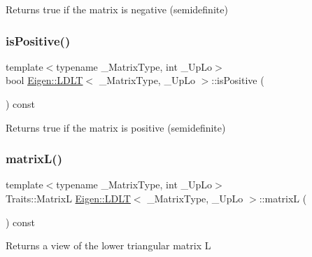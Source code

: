 \begin{DoxyReturn}{Returns}
true if the matrix is negative (semidefinite) 
\end{DoxyReturn}
\mbox{\label{class_eigen_1_1_l_d_l_t_a5e1c6b7ba8d7b82575d6ffdc3bf35bcb}} 
\subsubsection{\texorpdfstring{isPositive()}{isPositive()}}
{\footnotesize\ttfamily template$<$typename \+\_\+\+Matrix\+Type, int \+\_\+\+Up\+Lo$>$ \\
bool \mbox{\hyperlink{class_eigen_1_1_l_d_l_t}{Eigen\+::\+L\+D\+LT}}$<$ \+\_\+\+Matrix\+Type, \+\_\+\+Up\+Lo $>$\+::is\+Positive (\begin{DoxyParamCaption}{ }\end{DoxyParamCaption}) const\hspace{0.3cm}{\ttfamily [inline]}}

\begin{DoxyReturn}{Returns}
true if the matrix is positive (semidefinite) 
\end{DoxyReturn}
\mbox{\label{class_eigen_1_1_l_d_l_t_af0e6a0df5679873b42cf82a372dd8ddb}} 
\subsubsection{\texorpdfstring{matrixL()}{matrixL()}}
{\footnotesize\ttfamily template$<$typename \+\_\+\+Matrix\+Type, int \+\_\+\+Up\+Lo$>$ \\
Traits\+::\+MatrixL \mbox{\hyperlink{class_eigen_1_1_l_d_l_t}{Eigen\+::\+L\+D\+LT}}$<$ \+\_\+\+Matrix\+Type, \+\_\+\+Up\+Lo $>$\+::matrixL (\begin{DoxyParamCaption}{ }\end{DoxyParamCaption}) const\hspace{0.3cm}{\ttfamily [inline]}}

\begin{DoxyReturn}{Returns}
a view of the lower triangular matrix L 
\end{DoxyReturn}
\mbox{\label{class_eigen_1_1_l_d_l_t_aa5e0fd09dcd5251a8521fa248b95db0b}} 
